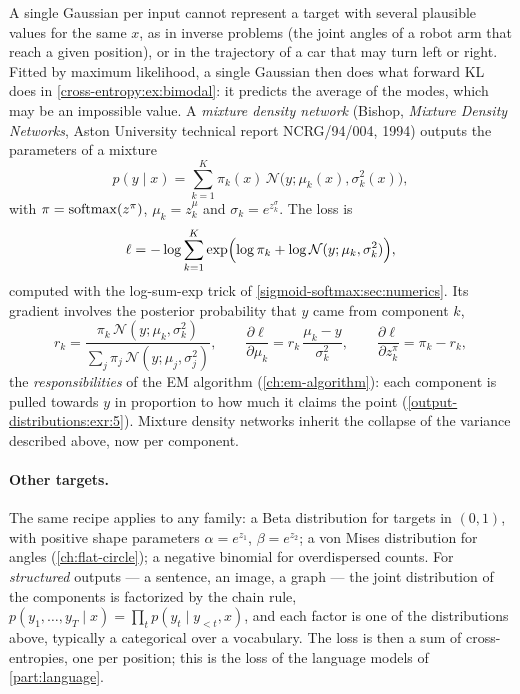 \begin{notechapter}
A single Gaussian per input cannot represent a target with several plausible
values for the same $x$, as in inverse problems (the joint angles of a robot arm
that reach a given position), or in the trajectory of a car that may turn left
or right. Fitted by maximum likelihood, a single Gaussian then does what forward
KL does in \cref{cross-entropy:ex:bimodal}: it predicts the average of the
modes, which may be an impossible value. A \emph{mixture density network} (Bishop,
\emph{Mixture Density Networks}, Aston University technical report NCRG/94/004, 1994) outputs the parameters of a mixture
\[
  p(y\mid x) = \sum_{k=1}^K\pi_k(x)\,\mathcal N\bigl(y;\mu_k(x), \sigma_k^2(x)\bigr),
\]
with $\pi = \operatorname{softmax}(z^\pi)$, $\mu_k = z^\mu_k$ and $\sigma_k = e^{z^\sigma_k}$. The loss is
\[
  \ell = -\log\sum_{k=1}^K\exp\Bigl(\log\pi_k + \log\mathcal N(y;\mu_k,\sigma_k^2)\Bigr),
\]
computed with the log-sum-exp trick of \cref{sigmoid-softmax:sec:numerics}. Its
gradient involves the posterior probability that $y$ came from component $k$,
\[
  r_k = \frac{\pi_k\,\mathcal N(y;\mu_k,\sigma_k^2)}{\sum_j\pi_j\,\mathcal N(y;\mu_j,\sigma_j^2)},\qquad
  \frac{\partial\ell}{\partial\mu_k} = r_k\,\frac{\mu_k - y}{\sigma_k^2},\qquad
  \frac{\partial\ell}{\partial z^\pi_k} = \pi_k - r_k,
\]
the \emph{responsibilities} of the EM algorithm (\cref{ch:em-algorithm}): each component is
pulled towards $y$ in proportion to how much it claims the point
(\cref{output-distributions:exr:5}). Mixture density networks inherit the
collapse of the variance described above, now per component.

\paragraph{Other targets.} The same recipe applies to any family: a Beta
distribution for targets in $(0,1)$, with positive shape parameters $\alpha = e^{z_1}$,
$\beta = e^{z_2}$; a von Mises distribution for angles (\cref{ch:flat-circle}); a
negative binomial for overdispersed counts. For \emph{structured} outputs ---
a sentence, an image, a graph --- the joint distribution of the components is
factorized by the chain rule, $p(y_1,\dots,y_T\mid x) = \prod_tp(y_t\mid y_{<t}, x)$, and each factor
is one of the distributions above, typically a categorical over a vocabulary.
The loss is then a sum of cross-entropies, one per position; this is the loss of
the language models of \cref{part:language}.


\end{notechapter}
